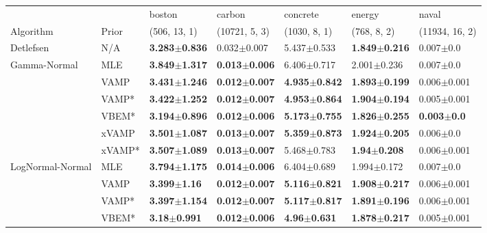 \begin{tabular}{lllllll}
\toprule
                 &        &                    boston &                    carbon &                  concrete &                    energy &                   naval \\
Algorithm & Prior& (506, 13, 1)& (10721, 5, 3)& (1030, 8, 1)& (768, 8, 2)& (11934, 16, 2)\\
\midrule
Detlefsen & N/A &  \textbf{3.283$\pm$0.836} &           0.032$\pm$0.007 &           5.437$\pm$0.533 &  \textbf{1.849$\pm$0.216} &           0.007$\pm$0.0 \\
Gamma-Normal & MLE &  \textbf{3.849$\pm$1.317} &  \textbf{0.013$\pm$0.006} &           6.406$\pm$0.717 &           2.001$\pm$0.236 &           0.007$\pm$0.0 \\
                 & VAMP &  \textbf{3.431$\pm$1.246} &  \textbf{0.012$\pm$0.007} &  \textbf{4.935$\pm$0.842} &  \textbf{1.893$\pm$0.199} &         0.006$\pm$0.001 \\
                 & VAMP* &  \textbf{3.422$\pm$1.252} &  \textbf{0.012$\pm$0.007} &  \textbf{4.953$\pm$0.864} &  \textbf{1.904$\pm$0.194} &         0.005$\pm$0.001 \\
                 & VBEM* &  \textbf{3.194$\pm$0.896} &  \textbf{0.012$\pm$0.006} &  \textbf{5.173$\pm$0.755} &  \textbf{1.826$\pm$0.255} &  \textbf{0.003$\pm$0.0} \\
                 & xVAMP &  \textbf{3.501$\pm$1.087} &  \textbf{0.013$\pm$0.007} &  \textbf{5.359$\pm$0.873} &  \textbf{1.924$\pm$0.205} &           0.006$\pm$0.0 \\
                 & xVAMP* &  \textbf{3.507$\pm$1.089} &  \textbf{0.013$\pm$0.007} &           5.468$\pm$0.783 &   \textbf{1.94$\pm$0.208} &         0.006$\pm$0.001 \\
LogNormal-Normal & MLE &  \textbf{3.794$\pm$1.175} &  \textbf{0.014$\pm$0.006} &           6.404$\pm$0.689 &           1.994$\pm$0.172 &           0.007$\pm$0.0 \\
                 & VAMP &   \textbf{3.399$\pm$1.16} &  \textbf{0.012$\pm$0.007} &  \textbf{5.116$\pm$0.821} &  \textbf{1.908$\pm$0.217} &         0.006$\pm$0.001 \\
                 & VAMP* &  \textbf{3.397$\pm$1.154} &  \textbf{0.012$\pm$0.007} &  \textbf{5.117$\pm$0.817} &  \textbf{1.891$\pm$0.196} &         0.006$\pm$0.001 \\
                 & VBEM* &   \textbf{3.18$\pm$0.991} &  \textbf{0.012$\pm$0.006} &   \textbf{4.96$\pm$0.631} &  \textbf{1.878$\pm$0.217} &         0.005$\pm$0.001 \\

\end{tabular}
